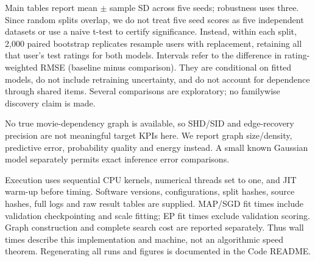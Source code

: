 Main tables report mean $\pm$ sample SD across five seeds; robustness uses
three. Since random splits overlap, we do not treat five seed scores as five
independent datasets or use a naive t-test to certify significance. Instead,
within each split, 2,000 paired bootstrap replicates resample users with
replacement, retaining all that user's test ratings for both models. Intervals
refer to the difference in rating-weighted RMSE (baseline minus comparison).
They are conditional on fitted models, do not include retraining uncertainty,
and do not account for dependence through shared items. Several comparisons
are exploratory; no familywise discovery claim is made.

No true movie-dependency graph is available, so SHD/SID and edge-recovery
precision are not meaningful target KPIs here. We report graph size/density,
predictive error, probability quality and energy instead. A small known
Gaussian model separately permits exact inference error comparisons.

Execution uses sequential CPU kernels, numerical threads set to one, and JIT
warm-up before timing. Software versions, configurations, split hashes, source
hashes, full logs and raw result tables are supplied. MAP/SGD fit times include
validation checkpointing and scale fitting; EP fit times exclude validation
scoring. Graph construction and complete search cost are reported separately.
Thus wall times describe this implementation and machine, not an algorithmic
speed theorem. Regenerating all runs and figures is documented in the Code README.
